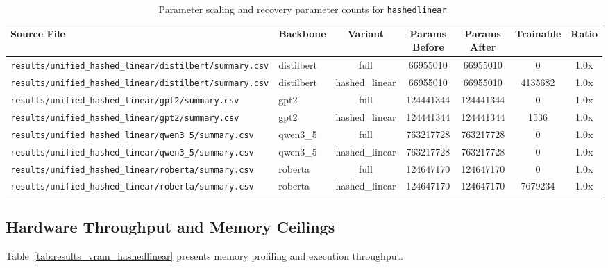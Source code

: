 \begin{table}[t]
\centering
\small
\begin{tabular}{llccccc}
\toprule
\textbf{Source File} & \textbf{Backbone} & \textbf{Variant} & \textbf{Params Before} & \textbf{Params After} & \textbf{Trainable} & \textbf{Ratio} \\
\midrule
\texttt{results/unified\_hashed\_linear/distilbert/summary.csv} & distilbert & full & 66955010 & 66955010 & 0 & 1.0x \\
\texttt{results/unified\_hashed\_linear/distilbert/summary.csv} & distilbert & hashed\_linear & 66955010 & 66955010 & 4135682 & 1.0x \\
\texttt{results/unified\_hashed\_linear/gpt2/summary.csv} & gpt2 & full & 124441344 & 124441344 & 0 & 1.0x \\
\texttt{results/unified\_hashed\_linear/gpt2/summary.csv} & gpt2 & hashed\_linear & 124441344 & 124441344 & 1536 & 1.0x \\
\texttt{results/unified\_hashed\_linear/qwen3\_5/summary.csv} & qwen3\_5 & full & 763217728 & 763217728 & 0 & 1.0x \\
\texttt{results/unified\_hashed\_linear/qwen3\_5/summary.csv} & qwen3\_5 & hashed\_linear & 763217728 & 763217728 & 0 & 1.0x \\
\texttt{results/unified\_hashed\_linear/roberta/summary.csv} & roberta & full & 124647170 & 124647170 & 0 & 1.0x \\
\texttt{results/unified\_hashed\_linear/roberta/summary.csv} & roberta & hashed\_linear & 124647170 & 124647170 & 7679234 & 1.0x \\
\bottomrule
\end{tabular}
\caption{Parameter scaling and recovery parameter counts for \texttt{hashedlinear}.}
\label{tab:results_params_hashedlinear}
\end{table}

\subsection{Hardware Throughput and Memory Ceilings}
Table~\ref{tab:results_vram_hashedlinear} presents memory profiling and execution throughput.

